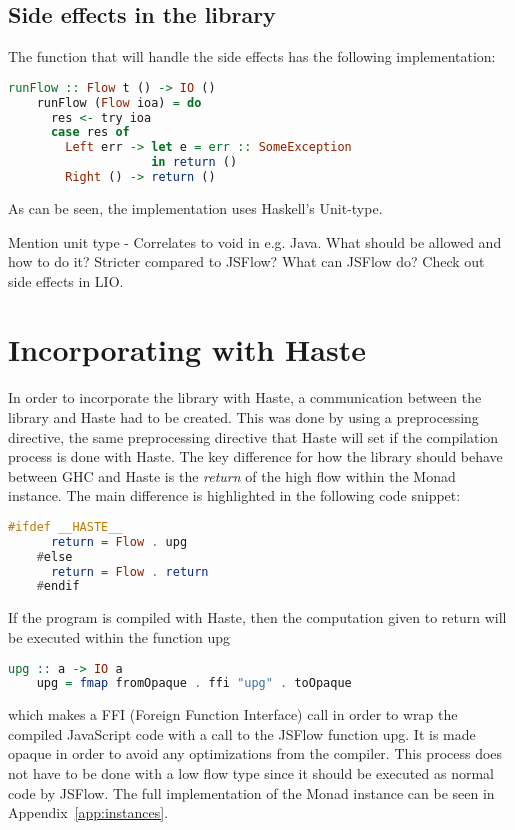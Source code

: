 \subsection{Side effects in the library}
The function that will handle the side effects has the following implementation:
\begin{center}
  \begin{lstlisting}[language=Haskell]
    runFlow :: Flow t () -> IO ()
    runFlow (Flow ioa) = do
      res <- try ioa
      case res of
        Left err -> let e = err :: SomeException
                    in return ()
        Right () -> return ()
  \end{lstlisting}
\end{center}
As can be seen, the implementation uses Haskell's Unit-type.

Mention unit type - Correlates to void in e.g. Java.
What should be allowed and how to do it?
Stricter compared to JSFlow?
What can JSFlow do?
Check out side effects in LIO.

\section{Incorporating with Haste}
In order to incorporate the library with Haste, a communication between the library and Haste had to be created. This was done by using a preprocessing directive, the same preprocessing directive that Haste will set if the compilation process is done with Haste. The key difference for how the library should behave between GHC and Haste is the \emph{return} of the high flow within the Monad instance. The main difference is highlighted in the following code snippet:
\begin{center}
  \begin{lstlisting}[language=Haskell]
    #ifdef __HASTE__
      return = Flow . upg
    #else
      return = Flow . return
    #endif
  \end{lstlisting}
\end{center}
If the program is compiled with Haste, then the computation given to return will be executed within the function upg
\begin{center}
  \begin{lstlisting}[language=Haskell]
    upg :: a -> IO a
    upg = fmap fromOpaque . ffi "upg" . toOpaque
  \end{lstlisting}
\end{center}
which makes a FFI (Foreign Function Interface) call in order to wrap the compiled JavaScript code with a call to the JSFlow function upg. It is made opaque in order to avoid any optimizations from the compiler. This process does not have to be done with a low flow type since it should be executed as normal code by JSFlow. The full implementation of the Monad instance can be seen in Appendix~\ref{app:instances}.
